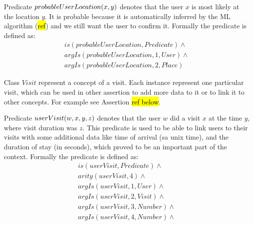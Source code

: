 \begin{definition}
\label{pred:probableUserLocation}

Predicate $\\probableUserLocation(x,y)$ denotes that the user $x$ is most likely
at the location $y$. It is probable because it is automatically inferred by the
ML algorithm (\hl{ref}) and we still want the user to confirm it.
Formally the predicate is defined as:
\begin{equation}\label{as:probableUserLoc}
\begin{gathered}
    is(probableUserLocation,Predicate) \land \\
	argIs(probableUserLocation,1,User) \land\\
	argIs(probableUserLocation,2, Place)
\end{gathered}
\end{equation}
\end{definition}

\begin{definition}\label{def:visit}
Class $Visit$ represent a concept of a visit. Each instance represent one
particular visit, which can be used in other assertion to add more data to it
or to link it to other concepts. For example see Assertion \hl{ref below}.
\end{definition}

\begin{definition}
\label{pred:userVisit}
Predicate $\\userVisit(w,x,y,z)$ denotes that the user $w$ did a visit $x$
at the time $y$, where visit duration was $z$. This predicate is used to be 
able to link users to their visits with some additional data like time of
arrival (sa unix time), and the duration of stay (in seconds), which proved to 
be an important part of the context. Formally the predicate is defined as:
\begin{equation}\label{as:userVisit}
\begin{gathered}
    is(userVisit,Predicate) \land \\
	arity(userVisit,4) \land \\
	argIs(userVisit,1,User) \land\\
	argIs(userVisit,2, Visit) \land \\
	argIs(userVisit,3,Number) \land \\
	argIs(userVisit,4,Number) \land
\end{gathered}
\end{equation}
\end{definition}


